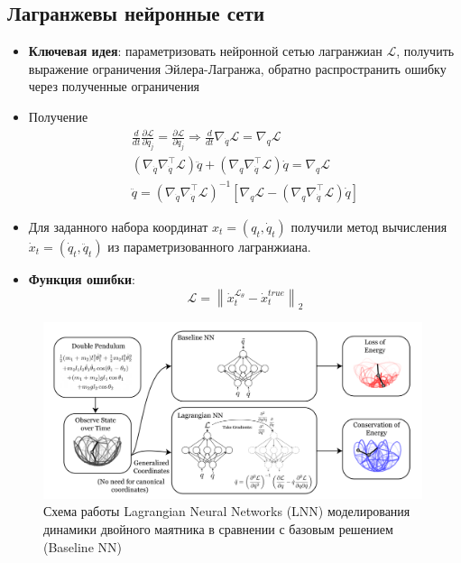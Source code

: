 \documentclass[12pt]{article}
\begin{document}
	\subsection{Лагранжевы нейронные сети}
	\begin{itemize}
		\item \textbf{Ключевая идея}: параметризовать нейронной сетью лагранжиан $\mathcal{L}$, получить выражение ограничения Эйлера-Лагранжа, обратно распространить ошибку через полученные ограничения
		\item Получение 	$$
		\begin{aligned}
		\frac{d}{d t} \frac{\partial \mathcal{L}}{\partial \dot{q}_{j}} =\frac{\partial \mathcal{L}}{\partial q_{j}}  \Rightarrow \frac{d}{d t} \nabla_{\dot{q}} \mathcal{L} =\nabla_{q} \mathcal{L} \\
		\left(\nabla_{\dot{q}} \nabla_{\dot{q}}^{\top} \mathcal{L}\right) \ddot{q}+\left(\nabla_{q} \nabla_{\dot{q}}^{\top} \mathcal{L}\right) \dot{q} =\nabla_{q} \mathcal{L} \\
		\ddot{q} =\left(\nabla_{\dot{q}} \nabla_{\dot{q}}^{\top} \mathcal{L}\right)^{-1}\left[\nabla_{q} \mathcal{L}-\left(\nabla_{q} \nabla_{\dot{q}}^{\top} \mathcal{L}\right) \dot{q}\right]
		\end{aligned}
		$$
		\item Для заданного набора координат $x_t = (q_t, \dot{q}_t)$ получили метод вычисления $\dot{x}_t = (\dot{q}_t, \ddot{q}_t)$ из параметризованного лагранжиана.
		\item \textbf{Функция ошибки}: $$\mathcal{L} = \left\|\dot{x}^{\mathcal{L_{\theta}}}_t -\dot{x}^{true}_t\right\|_{2}$$
	\end{itemize}

	\begin{figure}[h]
		\centering
		\includegraphics[width=0.99\textwidth]{lnn.png}
		\caption{Схема работы Lagrangian Neural Networks (LNN) моделирования динамики двойного маятника в сравнении с базовым решением (Baseline NN)}
	\end{figure}
\end{document}
